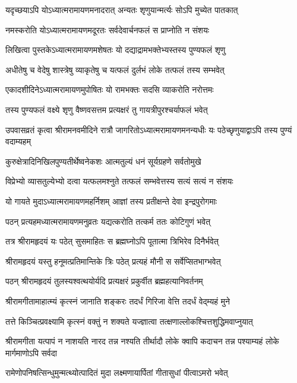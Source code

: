 \twolineshloka
{यदृच्छयाऽपि योऽध्यात्मरामायणमनादरात्}
{अन्यतः शृणुयान्मर्त्यः सोऽपि मुच्येत पातकात्} %

\twolineshloka
{नमस्करोति योऽध्यात्मरामायणमदूरतः}
{सर्वदेवार्चनफलं स प्राप्नोति न संशयः} %

\twolineshloka
{लिखित्वा पुस्तकेऽध्यात्मरामायणमशेषतः}
{यो दद्याद्रामभक्तेभ्यस्तस्य पुण्यफलं शृणु} %

\twolineshloka
{अधीतेषु च वेदेषु शास्त्रेषु व्याकृतेषु च}
{यत्फलं दुर्लभं लोके तत्फलं तस्य सम्भवेत्} %

\twolineshloka
{एकादशीदिनेऽध्यात्मरामायणमुपोषितः}
{यो रामभक्तः सदसि व्याकरोति नरोत्तमः} %

\twolineshloka
{तस्य पुण्यफलं वक्ष्ये शृणु वैष्णवसत्तम}
{प्रत्यक्षरं तु गायत्रीपुरश्चर्याफलं भवेत्} %

\threelineshloka
{उपवासव्रतं कृत्वा श्रीरामनवमीदिने}
{रात्रौ जागरितोऽध्यात्मरामायणमनन्यधीः}
{यः पठेच्छृणुयाद्वाऽपि तस्य पुण्यं वदाम्यहम्} %

\twolineshloka
{कुरुक्षेत्रादिनिखिलपुण्यतीर्थेष्वनेकशः}
{आत्मतुल्यं धनं सूर्यग्रहणे सर्वतोमुखे} %

\twolineshloka
{विप्रेभ्यो व्यासतुल्येभ्यो दत्वा यत्फलमश्नुते}
{तत्फलं सम्भवेत्तस्य सत्यं सत्यं न संशयः} %

\twolineshloka
{यो गायते मुदाऽध्यात्मरामायणमहर्निशम्}
{आज्ञां तस्य प्रतीक्षन्ते देवा इन्द्रपुरोगमाः} %

\twolineshloka
{पठन् प्रत्यहमध्यात्मरामायणमनुव्रतः}
{यद्यत्करोति तत्कर्म ततः कोटिगुणं भवेत्} %

\twolineshloka
{तत्र श्रीरामहृदयं यः पठेत् सुसमाहितः}
{स ब्रह्मघ्नोऽपि पूतात्मा त्रिभिरेव दिनैर्भवेत्} %

\twolineshloka
{श्रीरामहृदयं यस्तु हनूमत्प्रतिमान्तिके}
{त्रिः पठेत् प्रत्यहं मौनी स सर्वेप्सितभाग्भवेत्} %

\twolineshloka
{पठन् श्रीरामहृदयं तुलस्यश्वत्थयोर्यदि}
{प्रत्यक्षरं प्रकुर्वीत ब्रह्महत्यानिवर्तनम्} %

\twolineshloka
{श्रीरामगीतामाहात्म्यं कृत्स्नं जानाति शङ्करः}
{तदर्धं गिरिजा वेत्ति तदर्धं वेद्म्यहं मुने} %

\twolineshloka
{तत्ते किञ्चित्प्रवक्ष्यामि कृत्स्नं वक्तुं न शक्यते}
{यज्ज्ञात्वा तत्क्षणाल्लोकश्चित्तशुद्धिमवाप्नुयात्} %

\threelineshloka
{श्रीरामगीता यत्पापं न नाशयति नारद}
{तन्न नश्यति तीर्थादौ लोके क्वापि कदाचन}
{तन्न पश्याम्यहं लोके मार्गमाणोऽपि सर्वदा} %

\twolineshloka
{रामेणोपनिषत्सिन्धुमुन्मत्थ्योत्पादितं मुदा}
{लक्ष्मणायार्पितां गीतासुधां पीत्वाऽमरो भवेत्} %

